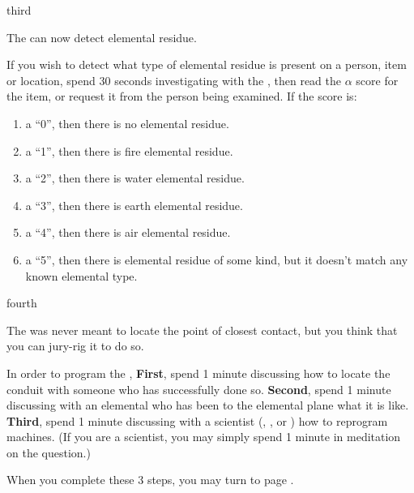 \documentclass[notebook]{elementals}
\begin{document}
\begin{page}{third}

The \iTricorder{} can now detect elemental residue.

If you wish to detect what type of elemental residue is present on a person, item or location, spend 30 seconds investigating with the \iTricorder{}, then read the $\alpha$ score for the item, or request it from the person being examined. If the score is:

\begin{enumerate}
  \item a ``0'', then there is no elemental residue.
  \item a ``1'', then there is fire elemental residue.
  \item a ``2'', then there is water elemental residue.
  \item a ``3'', then there is earth elemental residue.
  \item a ``4'', then there is air elemental residue.
  \item a ``5'', then there is elemental residue of some kind, but it doesn't match any known elemental type.
\end{enumerate}

\end{page}

\begin{page}{fourth}

The \iTricorder{} was never meant to locate the point of closest contact, but you think that you can jury-rig it to do so.

In order to program the \iTricorder{}, {\bf First}, spend 1 minute discussing how to locate the conduit with someone who has successfully done so. {\bf Second}, spend 1 minute discussing with an elemental who has been to the elemental plane what it is like. {\bf Third}, spend 1 minute discussing with a scientist (\cGD{}, \cScientist{}, or \cMS{}) how to reprogram machines. (If you are a scientist, you may simply spend 1 minute in meditation on the question.)

When you complete these 3 steps, you may turn to page .

\end{page}
\end{document}
